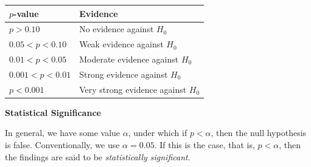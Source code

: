 \documentclass[10pt]{article}
\newenvironment{aside}{\begin{tcolorbox}[colframe=white,colback=_grey2,arc=0pt,outer arc=0pt,breakable]}{\end{tcolorbox}}
\newcommand{\spacer}[0]{\par\vspace{0.1in}}
\begin{document}
\begin{enumerate}
    \begin{center}
        \begin{tabular}{|l|l|}
\hline
\rowcolor[HTML]{EFEFEF} 
\textbf{$p$-value} & \textbf{Evidence}                  \\ \hline
$p>0.10$           & No evidence against $H_0$          \\ \hline
$0.05<p<0.10$      & Weak evidence against $H_0$        \\ \hline
$0.01<p<0.05$      & Moderate evidence against $H_0$    \\ \hline
$0.001<p<0.01$     & Strong evidence against $H_0$      \\ \hline
$p<0.001$          & Very strong evidence against $H_0$ \\ \hline
\end{tabular}
    \end{center}
\end{enumerate}
\begin{aside}
    \textbf{Statistical Significance}
    \spacer
    In general, we have some value $\alpha$, under which if $p<\alpha$, then the null hypothesis is false. Conventionally, we use $\alpha=0.05$. If this is the case, that is, $p<\alpha$, then the findings are said to be \textit{statistically significant}.
\end{aside}
\end{document}

